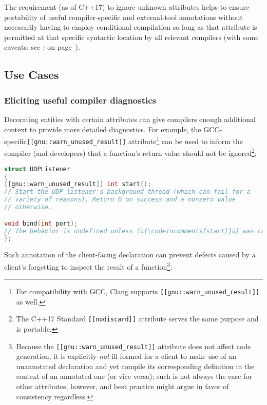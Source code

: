 The requirement (as of C++17) to ignore unknown attributes helps to
ensure portability of useful compiler-specific and external-tool
annotations without necessarily having to employ conditional compilation
so long as that attribute is permitted at that specific syntactic
location by all relevant compilers (with some caveats;
see {\it{}:} {\it{}} on page~\pageref{not-every-syntactic-location-is-viable-for-an-attribute}).

\subsection[Use Cases]{Use Cases}\label{attribute-use-cases}

\subsubsection[Eliciting useful compiler diagnostics]{Eliciting useful compiler diagnostics}\label{eliciting-useful-compiler-diagnostics}

Decorating entities with certain attributes can give compilers enough
additional context to provide more detailed diagnostics. For example,
the GCC-specific\linebreak[4] \texttt{[[gnu::warn\_unused\_result]]}
attribute{\cprotect\footnote{For compatibility with GCC,
Clang supports \texttt{[[gnu::warn\_unused\_result]]} as
well.}} can be used to inform the compiler (and developers) that a
function's return value should not be ignored{\cprotect\footnote{The
C++17 Standard \texttt{[[nodiscard]]} attribute serves the same
purpose and is portable.}}:

\begin{lstlisting}[language=C++]
struct UDPListener
{
[[gnu::warn_unused_result]] int start();
// Start the UDP listener's background thread (which can fail for a
// variety of reasons). Return 0 on success and a nonzero value
// otherwise.

void bind(int port);
// The behavior is undefined unless (ù{\codeincomments{start}}ù) was called successfully.
};
\end{lstlisting}
\pagebreak%

\noindent Such annotation of the client-facing declaration can prevent defects
caused by a client's forgetting to inspect the result of a
function{\cprotect\footnote{Because the
\texttt{[[gnu::warn\_unused\_result]]} attribute does not affect code
generation, it is explicitly \emph{not} ill formed for a client to
make use of an unannotated declaration and yet compile its
corresponding definition in the context of an annotated one (or vice
versa); such is not always the case for other attributes, however, and
best practice might argue in favor of consistency regardless.}}:

